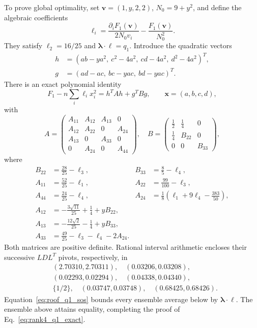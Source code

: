 \documentclass[11pt]{article}
\begin{document}
To prove global optimality, set $\mathbf v=(1,y,2,2)$, $N_0=9+y^2$, and define the algebraic coefficients
\begin{equation}\label{eq:roof_ell1}
 \ell_i=\frac{\partial_iF_1(\mathbf v)}{2N_0v_i}
       -\frac{F_1(\mathbf v)}{N_0^2}.
\end{equation}
They satisfy $\ell_2=16/25$ and $\boldsymbol\lambda\cdot\boldsymbol\ell=q_1$. Introduce the quadratic vectors
\begin{align}
 h&=(ab-ya^2,\ c^2-4a^2,\ cd-4a^2,\ d^2-4a^2)^T,\nonumber\\
 g&=(ad-ac,\ bc-yac,\ bd-yac)^T.
\end{align}
There is an exact polynomial identity
\begin{equation}\label{eq:roof_q1_sos}
 F_1-n\sum_i\ell_i x_i^2=h^TAh+g^TBg,
 \qquad \mathbf x=(a,b,c,d),
\end{equation}
with
\begin{equation}
 A=\begin{pmatrix}
 A_{11}&A_{12}&A_{13}&0\\
 A_{12}&A_{22}&0&A_{24}\\
 A_{13}&0&A_{33}&0\\
 0&A_{24}&0&A_{44}
 \end{pmatrix},\quad
 B=\begin{pmatrix}
 \tfrac12&\tfrac14&0\\
 \tfrac14&B_{22}&0\\
 0&0&B_{33}
 \end{pmatrix},
\end{equation}
where
\begin{align}
 B_{22}&=\tfrac{28}{25}-\ell_3,&B_{33}&=\tfrac85-\ell_4,\nonumber\\
 A_{11}&=\tfrac{52}{25}-\ell_1,&A_{22}&=\tfrac{99}{100}-\ell_3,\nonumber\\
 A_{44}&=\tfrac{24}{25}-\ell_4,&A_{24}&=\tfrac18(\ell_1+9\ell_4-\tfrac{383}{50}),\nonumber\\
 A_{12}&=-\tfrac{3\sqrt{11}}{25}+\tfrac14+yB_{22},\nonumber\\
 A_{13}&=-\tfrac{12\sqrt2}{25}-\tfrac14+yB_{33},\nonumber\\
 A_{33}&=\tfrac{49}{25}-\ell_3-\ell_4-2A_{24}.
\end{align}
Both matrices are positive definite. Rational interval arithmetic encloses their successive $LDL^T$ pivots, respectively, in
\begin{align}
 &(2.70310,2.70311),\quad(0.03206,0.03208),\nonumber\\
 &(0.02293,0.02294),\quad(0.04338,0.04340),\nonumber\\
 &\{1/2\},\quad(0.03747,0.03748),\quad(0.68425,0.68426).
\end{align}
Equation~\eqref{eq:roof_q1_sos} bounds every ensemble average below by $\boldsymbol\lambda\cdot\boldsymbol\ell$. The ensemble above attains equality, completing the proof of Eq.~\eqref{eq:rank4_q1_exact}.
\end{document}
